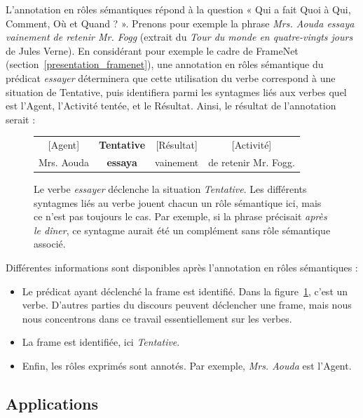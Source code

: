 L'annotation en rôles sémantiques répond à la question « Qui a fait Quoi à Qui,
Comment, Où et Quand ? ». Prenons pour exemple la phrase \textit{Mrs. Aouda
essaya vainement de retenir Mr. Fogg} (extrait du \textit{Tour du monde en
quatre-vingts jours} de Jules Verne).  En considérant pour exemple le cadre de
FrameNet (section~\ref{presentation_framenet}), une annotation en rôles
sémantique du prédicat \textit{essayer} déterminera que cette utilisation du
verbe correspond à une situation de Tentative, puis identifiera parmi les
syntagmes liés aux verbes quel est l'Agent, l'Activité tentée, et le Résultat.
Ainsi, le résultat de l'annotation serait :

\begin{figure}[ht]
    \centering
    \begin{tabular}{cccc}
    [Agent]  & \textbf{Tentative} & [Résultat]  & [Activité]         \tabularnewline
    Mrs. Aouda & \textbf{essaya}  & vainement & de retenir Mr. Fogg. \tabularnewline
    \end{tabular}
    \caption{\label{fig:introsrl}Le verbe \textit{essayer} déclenche la situation
        \textit{Tentative}. Les différents syntagmes liés au verbe jouent chacun
        un rôle sémantique ici, mais ce n'est pas toujours le cas. Par exemple,
        si la phrase précisait \textit{après le dîner}, ce syntagme aurait été un
    complément sans rôle sémantique associé.}

\end{figure}

Différentes informations sont disponibles après l'annotation en rôles
sémantiques :

\begin{itemize}
    \item Le prédicat ayant déclenché la frame est identifié. Dans la
        figure~\ref{fig:introsrl}, c'est un verbe. D'autres parties du
        discours peuvent déclencher une frame, mais nous nous concentrons dans
        ce travail essentiellement sur les verbes.
    \item La frame est identifiée, ici \textit{Tentative}.
    \item Enfin, les rôles exprimés sont annotés. Par exemple, \textit{Mrs.
        Aouda} est l'Agent.
\end{itemize}

\subsection{Applications}

